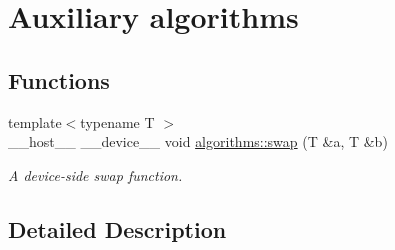 \hypertarget{group__auxiliary__algorithms}{}\section{Auxiliary algorithms}
\label{group__auxiliary__algorithms}
\subsection*{Functions}
\begin{DoxyCompactItemize}
\item 
{\footnotesize template$<$typename T $>$ }\\\+\_\+\+\_\+host\+\_\+\+\_\+ \+\_\+\+\_\+device\+\_\+\+\_\+ void \hyperlink{group__auxiliary__algorithms_ga69ab10800d18d0a10396e4acf436f3ef}{algorithms\+::swap} (T \&a, T \&b)\hypertarget{group__auxiliary__algorithms_ga69ab10800d18d0a10396e4acf436f3ef}{}\label{group__auxiliary__algorithms_ga69ab10800d18d0a10396e4acf436f3ef}

\begin{DoxyCompactList}\small\item\em A device-\/side swap function. \end{DoxyCompactList}\end{DoxyCompactItemize}


\subsection{Detailed Description}
